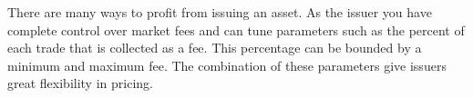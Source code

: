 There are many ways to profit from issuing an asset. As the issuer you have
complete control over market fees and can tune parameters such as the percent
of each trade that is collected as a fee. This percentage can be bounded by a
minimum and maximum fee. The combination of these parameters give issuers great
flexibility in pricing.
